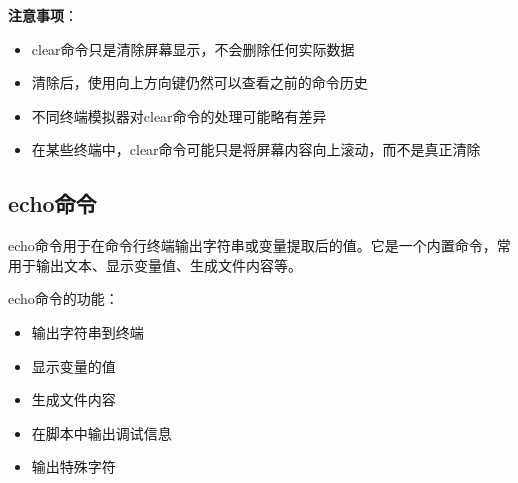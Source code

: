 \documentclass[12pt,UTF8]{ctexbook}
\begin{document}
\textbf{注意事项}：
\begin{itemize}
    \item clear命令只是清除屏幕显示，不会删除任何实际数据
    \item 清除后，使用向上方向键仍然可以查看之前的命令历史
    \item 不同终端模拟器对clear命令的处理可能略有差异
    \item 在某些终端中，clear命令可能只是将屏幕内容向上滚动，而不是真正清除
\end{itemize}

\subsection{echo命令}
echo命令用于在命令行终端输出字符串或变量提取后的值。它是一个内置命令，常用于输出文本、显示变量值、生成文件内容等。

echo命令的功能：
\begin{itemize}
    \item 输出字符串到终端
    \item 显示变量的值
    \item 生成文件内容
    \item 在脚本中输出调试信息
    \item 输出特殊字符
\end{itemize}
\end{document}
